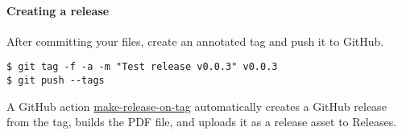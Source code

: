 \hypertarget{creating-a-release}{%
\paragraph{Creating a release}\label{creating-a-release}}

After committing your files, create an annotated tag and push it to
GitHub.

\begin{verbatim}
$ git tag -f -a -m "Test release v0.0.3" v0.0.3
$ git push --tags
\end{verbatim}

A GitHub action
\href{.github/workflows/make-release-on-tag.yml}{make-release-on-tag}
automatically creates a GitHub release from the tag, builds the PDF
file, and uploads it as a release asset to Releases.
